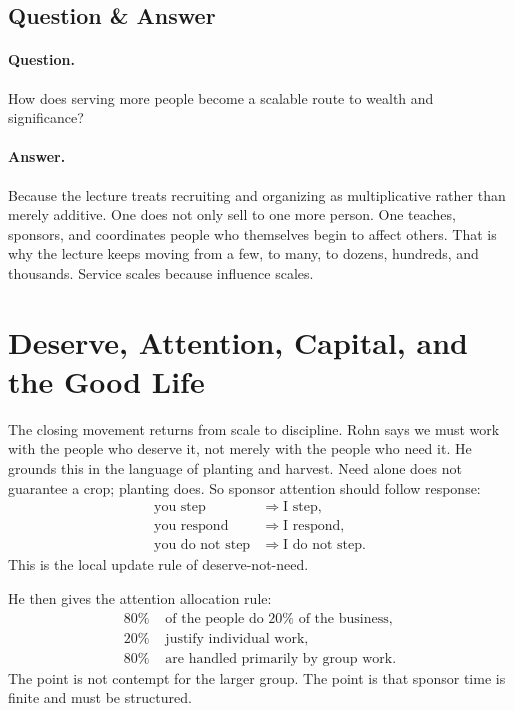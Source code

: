 \subsection{Question \& Answer}

\paragraph{Question.} How does serving more people become a scalable route to wealth and significance?

\paragraph{Answer.} Because the lecture treats recruiting and organizing as multiplicative rather than merely additive. One does not only sell to one more person. One teaches, sponsors, and coordinates people who themselves begin to affect others. That is why the lecture keeps moving from a few, to many, to dozens, hundreds, and thousands. Service scales because influence scales.

\section{Deserve, Attention, Capital, and the Good Life}

The closing movement returns from scale to discipline. Rohn says we must work with the people who deserve it, not merely with the people who need it. He grounds this in the language of planting and harvest. Need alone does not guarantee a crop; planting does. So sponsor attention should follow response:
\begin{align}
\text{you step} &\Rightarrow \text{I step},\\
\text{you respond} &\Rightarrow \text{I respond},\\
\text{you do not step} &\Rightarrow \text{I do not step}.
\end{align}
This is the local update rule of deserve-not-need.

He then gives the attention allocation rule:
\begin{align}
80\% &\text{ of the people do }20\%\text{ of the business},\\
20\% &\text{ justify individual work},\\
80\% &\text{ are handled primarily by group work}.
\end{align}
The point is not contempt for the larger group. The point is that sponsor time is finite and must be structured.


